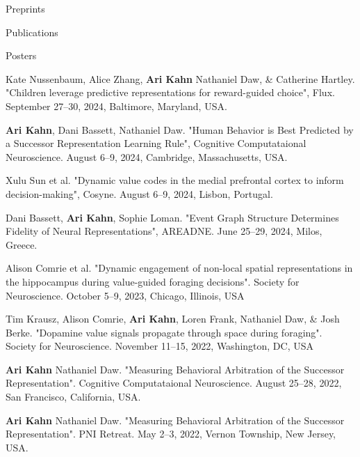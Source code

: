 \documentclass{resume} %
\begin{document}
\begin{rSection}{Preprints}
\nocite{*}
\printbibliography[heading=none, keyword=preprint]
\end{rSection}

\begin{rSection}{Publications}
\printbibliography[heading=none, notkeyword=preprint]
\end{rSection}

\begin{rSection}{Posters}

Kate Nussenbaum, Alice Zhang, \textbf{Ari Kahn} Nathaniel Daw, \& Catherine Hartley. "Children leverage predictive representations for reward-guided choice", Flux. September 27--30, 2024, Baltimore, Maryland, USA.

\textbf{Ari Kahn}, Dani Bassett, Nathaniel Daw. "Human Behavior is Best Predicted by a Successor Representation Learning Rule", Cognitive Computataional Neuroscience. August 6--9, 2024, Cambridge, Massachusetts, USA.

Xulu Sun et al. "Dynamic value codes in the medial prefrontal cortex to inform decision-making", Cosyne. August 6--9, 2024, Lisbon, Portugal.

Dani Bassett, \textbf{Ari Kahn}, Sophie Loman. "Event Graph Structure Determines Fidelity of Neural Representations", AREADNE. June 25--29, 2024, Milos, Greece.

Alison Comrie et al. "Dynamic engagement of non-local spatial representations in the hippocampus during value-guided foraging decisions". Society for Neuroscience. October 5--9, 2023, Chicago, Illinois, USA

Tim Krausz, Alison Comrie, \textbf{Ari Kahn}, Loren Frank, Nathaniel Daw, \& Josh Berke. "Dopamine value signals propagate through space during foraging". Society for Neuroscience. November 11--15, 2022, Washington, DC, USA

\textbf{Ari Kahn} Nathaniel Daw. "Measuring Behavioral Arbitration of the Successor Representation". Cognitive Computataional Neuroscience. August 25--28, 2022, San Francisco, California, USA.

\textbf{Ari Kahn} Nathaniel Daw. "Measuring Behavioral Arbitration of the Successor Representation". PNI Retreat. May 2--3, 2022, Vernon Township, New Jersey, USA.


\end{rSection}
\end{document}
